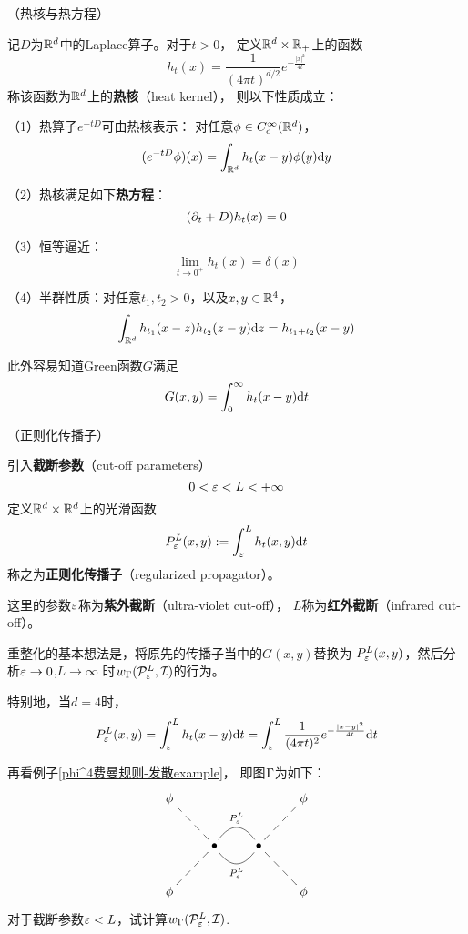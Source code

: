 \begin{lemma}（热核与热方程）

记$D$为$\mathbb{R}^d$中的Laplace算子。对于$t>0$，
定义$\mathbb{R}^d\times\mathbb{R}_+$上的函数
$$h_t(x)=\frac{1}{(4\pi t)^{d/2}}
           e^{-\frac{|x|^2}{4t}}$$
称该函数为$\mathbb{R}^d$上的\textbf{热核}（heat kernel），
则以下性质成立：

（1）热算子$e^{-tD}$可由热核表示：
对任意$\phi\in C_c^\infty(\mathbb{R}^d)$，
$$(e^{-tD}\phi)(x)
=\int_{\mathbb{R}^d}h_t(x-y)\phi(y)\mathrm{d} y$$

（2）热核满足如下\textbf{热方程}：
$$(\partial_t+D)h_t(x)=0$$

（3）恒等逼近：
$$\lim_{t\to 0^+}h_t(x)=\delta(x)$$

（4）半群性质：对任意$t_1,t_2>0$，以及$x,y\in\mathbb{R}^4$，
$$\int_{\mathbb{R}^d}
    h_{t_1}(x-z)h_{t_2}(z-y)\mathrm{d} z
=   h_{t_1+t_2}(x-y)$$
\end{lemma}
此外容易知道Green函数$G$满足
$$G(x,y)=\int_0^\infty h_t(x-y)\mathrm{d} t$$

\begin{notation}（正则化传播子）

引入\textbf{截断参数}（cut-off parameters）
$$0<\varepsilon<L<+\infty$$%
定义$\mathbb{R}^d\times\mathbb{R}^d$上的光滑函数
$$P^L_{\varepsilon}(x,y):=\int_\varepsilon^L h_t(x,y)\mathrm{d} t$$
称之为\textbf{正则化传播子}（regularized propagator）。
\end{notation}

这里的参数$\varepsilon$称为\textbf{紫外截断}（ultra-violet cut-off），
$L$称为\textbf{红外截断}（infrared cut-off）。

重整化的基本想法是，将原先的传播子当中的$G(x,y)$替换为
$P^L_\varepsilon(x,y)$，然后分析$\varepsilon\to 0$,$L\to\infty$
时$w_{\Gamma}(\mathcal{P}_\varepsilon^L,\mathcal{I})$的行为。

特别地，当$d=4$时，
$$
  P^L_\varepsilon(x,y)
=
  \int_\varepsilon^L
    h_t(x-y)\mathrm{d} t
=
  \int_\varepsilon^L
    \frac{1}{(4\pi t)^2}
    e^{-\frac{|x-y|^2}{4t}}
    \mathrm{d} t
$$\vs

\begin{example}再看例子\ref{phi^4费曼规则-发散example}，
即图$\Gamma$为如下：
$$
  \xymatrix{
     \phi          \ar@{--}[rd]
    &&&\phi        \ar@{--}[ld]
  \\
    &\bullet       \ar@{-}@/^1.2pc/[r] ^{P^L_\veps}  
                   \ar@{-}@/_1.2pc/[r] _{P^L_\veps}  
    &\bullet
    &
  \\
    \phi           \ar@{--}[ru]
    &&&\phi        \ar@{--}[lu]
  }
$$
对于截断参数$\varepsilon<L$，试计算$w_\Gamma(\mathcal{P}^L_\varepsilon,\mathcal{I})$.
\end{example}

